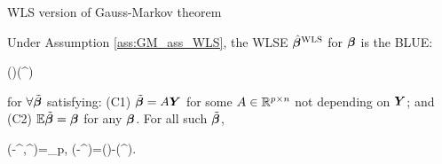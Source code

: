 \documentclass[10pt,a4paper]{book}
\begin{document}
\begin{thmbox}{WLS version of Gauss-Markov theorem}
	\begin{corollary}\label{cor:GM_WLS}
		Under Assumption \ref{ass:GM_ass_WLS}, the WLSE $\hat{{\boldsymbol\beta}}^{\textsc{WLS}}$ for ${\boldsymbol\beta}$ is the BLUE: 
		\begin{sequation*}
			\Cov(\tilde{\bab})\succeq\Cov(\hat{\bab}^{\WLS})
		\end{sequation*}
		for $\forall \tilde{{\boldsymbol\beta}}$ satisfying: (C1) $\tilde{{\boldsymbol\beta}}=A{\boldsymbol Y}$ for some $A\in\mathbb R^{p\times n}$ not depending on ${\boldsymbol Y}$; and (C2) $\mathbb E\tilde{{\boldsymbol\beta}}={\boldsymbol\beta}$ for any ${\boldsymbol\beta}$.     
		For all such $\tilde{{\boldsymbol\beta}}$, 
		\begin{salign*}
			\Cov(\tilde{\bab}-\hat{\bab}^{\WLS},\hat{\bab}^{\WLS})=\0_p, \qquad \Cov(\tilde{\bab}-\hat{\bab}^{\WLS})=\Cov(\tilde{\bab})-\Cov(\hat{\bab}^{\WLS}).
		\end{salign*}
	\end{corollary}
\end{thmbox}
    
\end{document}
